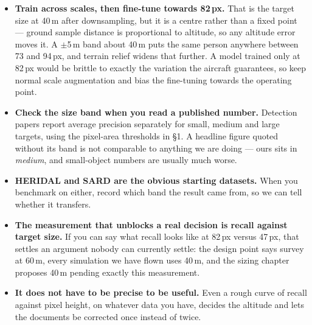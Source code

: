 \documentclass[11pt,a4paper]{article}
\begin{document}
\begin{itemize}\itemsep3pt

\item \textbf{Train across scales, then fine-tune towards
82\,px.} That is the target size at 40\,m after downsampling,
but it is a centre rather than a fixed point --- ground sample distance is
proportional to altitude, so any altitude error moves it. A $\pm$5\,m band about
40\,m puts the same person anywhere between 73 and 94\,px,
and terrain relief widens that further. A model trained only at
82\,px would be brittle to exactly the variation the aircraft
guarantees, so keep normal scale augmentation and bias the fine-tuning towards
the operating point.

\item \textbf{Check the size band when you read a published number.} Detection
papers report average precision separately for small, medium and large targets,
using the pixel-area thresholds in \S1. A headline figure quoted without its
band is not comparable to anything we are doing --- ours sits in
\emph{medium}, and small-object numbers are usually much worse.

\item \textbf{HERIDAL and SARD are the obvious starting datasets.} When you
benchmark on either, record which band the result came from, so we can tell
whether it transfers.

\item \textbf{The measurement that unblocks a real decision is recall against
target size.} If you can say what recall looks like at
82\,px versus 47\,px, that settles an argument
nobody can currently settle: the design point says survey at 60\,m, every
simulation we have flown uses 40\,m, and the sizing chapter proposes 40\,m
pending exactly this measurement.

\item \textbf{It does not have to be precise to be useful.} Even a rough curve
of recall against pixel height, on whatever data you have, decides the altitude
and lets the documents be corrected once instead of twice.

\end{itemize}
\end{document}
